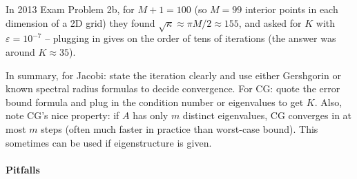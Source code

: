 \documentclass[a4paper,11pt]{article}
\begin{document}
In 2013 Exam Problem 2b, for $M+1=100$ (so $M=99$ interior points in each dimension of a 2D grid) they found $\sqrt{\kappa}\approx \pi M/2 \approx 155$, and asked for $K$ with $\varepsilon=10^{-7}$ -- plugging in gives on the order of tens of iterations (the answer was around $K\approx 35$).

In summary, for Jacobi: state the iteration clearly and use either Gershgorin or known spectral radius formulas to decide convergence. For CG: quote the error bound formula and plug in the condition number or eigenvalues to get $K$. Also, note CG's nice property: if $A$ has only $m$ distinct eigenvalues, CG converges in at most $m$ steps (often much faster in practice than worst-case bound). This sometimes can be used if eigenstructure is given.

\paragraph{Pitfalls}
\end{document}
